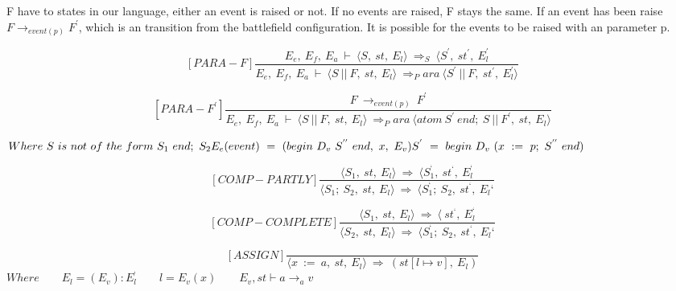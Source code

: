 	
	
	
	
	F have to states in our language, either an event is raised or not. If no events are raised, F stays the same. If an event has been raise \begin{math} F \rightarrow_{event(p)} F^{'} \end{math}, which is an transition from the battlefield configuration. It is possible for the events to be raised with an parameter p. 
	
	
	
	
	
	\[	
	[PARA-F]	
	\dfrac{E_e, \ E_f, \ E_a \ \vdash \ \langle S, \ st, \ E_l \rangle \ \Rightarrow_S \ \langle S^{'}, \ st^{'}, \ E_l^{'}}{E_e, \ E_f, \ E_a \ \vdash \ \langle S \ || \ F, \ st, \ E_l \rangle \ \Rightarrow_Para \ \langle S^{'} \ || \ F, \ st^{'}, \ E_l^{'} \rangle}	
	\]
	
	
	
	
	
	\[	
	[PARA-F^{'}]	
	\dfrac{F \ \rightarrow_{event(p)} \ F^{'}}{E_e, \ E_f, \ E_a \ \vdash \ \langle S \ || \ F, \ st, \ E_l \rangle \ \Rightarrow_Para \ \langle atom \ S^{'} \ end; \ S \ || \ F^{'}, \ st, \ E_l \rangle}	
	\]
	
	
	
	
	
	\begin{math}		
		Where \ S \ is \ not \ of \ the \ form \ S_1 \ end; \ S_2 \newline		
		E_e(event) \ = \ (begin \ D_v \ S^{''} \ end, \ x, \ E_v) \newline		
		S^{'} \ = \ begin \ D_v \ (x \ := \ p; \ S^{''} \ end)		
	\end{math}
	
	
	
	
	
	\[
	[COMP-PARTLY]
	\dfrac{\langle S_1, \ st, \ E_l \rangle \ \Rightarrow \ \langle S_1^{‘}, \ st^{‘}, \ E_l^{‘}}{\langle S_1; \ S_2, \ st, \ E_l \rangle \ \Rightarrow \ \langle S_1^{‘}; \ S_2, \ st^{‘}, \ E_l{‘}}
	\]
	
	\[
	[COMP-COMPLETE]
	\dfrac{\langle S_1, \ st, \ E_l \rangle \ \Rightarrow \ \langle \ st^{‘}, \ E_l^{‘}}{\langle S_2, \ st, \ E_l \rangle \ \Rightarrow \ \langle S_1^{‘}; \ S_2, \ st^{‘}, \ E_l{‘}}
	\]
	
	\[
	[ASSIGN]
	\dfrac{}{\langle x \ := \ a, \ st, \ E_l \rangle \ \Rightarrow \ (st[l \mapsto v], \ E_l)}
	\]
	\begin{math}
		Where
		\qquad E_l = (E_v) : E_l^{‘}
		\qquad l = E_v(x)
		\qquad E_v, st \vdash a \rightarrow_a v
	\end{math}
	
